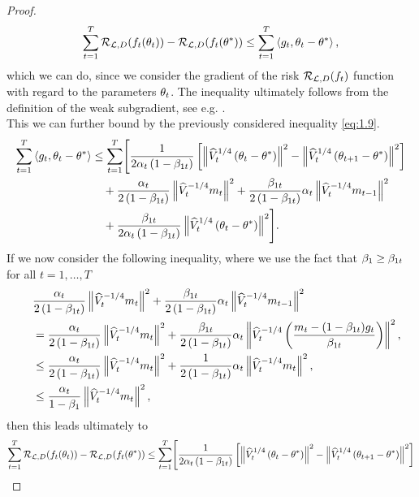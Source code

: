 \begin{proof}
\begin{align*}
\sum_{t=1}^T \operatorname{\mathcal{R}}_{\operatorname{\mathcal{L}}, D}(f_t(\theta_t)) - \operatorname{\mathcal{R}}_{\operatorname{\mathcal{L}}, D}(f_t(\theta^{\ast}))\leq \sum_{t=1}^T \left\langle g_t, \theta_t - \theta^{\ast} \right\rangle,
\end{align*}
which we can do, since we consider the gradient of the risk $\operatorname{\mathcal{R}}_{\operatorname{\mathcal{L}}, D}(f_t)$ function with regard to the parameters $\theta_t$. The inequality ultimately follows from the definition of the weak subgradient, see e.g. \cite[Remark~16.11.]{jahn2009vector}.\\
This we can further bound by the previously considered inequality \eqref{eq:1.9}.
\begin{align*}
\sum_{t=1}^T \left\langle g_t, \theta_t - \theta^{\ast} \right\rangle &\leq\sum_{t=1}^T \Biggl[ \frac{1}{2\alpha_t\left(1-\beta_{1t}\right)} \left[\left\| \widehat{V}_t^{1/4} \left( \theta_t - \theta^{\ast} \right) \right\|^2 - \left\| \widehat{V}_t^{1/4}\left(\theta_{t+1} - \theta^{\ast} \right) \right\|^2 \right] \\
&\quad +\frac{\alpha_t}{2\left(1-\beta_{1t}\right)} \left\| \widehat{V}_t^{-1/4} m_t \right\|^2 + \frac{\beta_{1t}}{2\left(1-\beta_{1t}\right)} \alpha_t \left\| \widehat{V}_t^{-1/4} m_{t-1}\right\|^2\\
&\quad + \frac{\beta_{1t}}{2\alpha_t \left( 1-\beta_{1t} \right)} \left\| \widehat{V}_t^{1/4}\left(\theta_t -\theta^{\ast} \right) \right\|^2 \Biggr].
\end{align*}
If we now consider the following inequality, where we use the fact that $\beta_1\geq \beta_{1t}$ for all $t=1,\ldots,T$
\begin{align*}
&\frac{\alpha_t}{2\left(1-\beta_{1t}\right)} \left\| \widehat{V}_t^{-1/4} m_t \right\|^2 + \frac{\beta_{1t}}{2\left(1-\beta_{1t}\right)} \alpha_t \left\| \widehat{V}_t^{-1/4} m_{t-1}\right\|^2\\
\quad &= \frac{\alpha_t}{2\left(1-\beta_{1t}\right)} \left\| \widehat{V}_t^{-1/4} m_t \right\|^2 + \frac{\beta_{1t}}{2\left(1-\beta_{1t}\right)} \alpha_t \left\| \widehat{V}_t^{-1/4} \left(\frac{m_{t} - (1-\beta_{1t})g_t}{\beta_{1t}}\right)\right\|^2,\\
\quad &\leq \frac{\alpha_t}{2\left(1-\beta_{1t}\right)} \left\| \widehat{V}_t^{-1/4} m_t \right\|^2 + \frac{1}{2\left(1-\beta_{1t}\right)} \alpha_t \left\| \widehat{V}_t^{-1/4} m_{t}\right\|^2,\\
\quad &\leq \frac{\alpha_t}{1-\beta_{1}} \left\| \widehat{V}_t^{-1/4} m_t \right\|^2,
\end{align*}
then this leads ultimately to
\begin{align}\label{eq:1.10}
\sum_{t=1}^T \risk_{\loss, D}(f_t(\t_t)) - \risk_{\loss, D}(f_t(\t^{\ast})) &\leq \sum_{t=1}^T \Biggl[ \frac{1}{2\a_t\left(1-\b_{1t}\right)} \left[\left\| \hat{V}_t^{1/4} \left( \t_t - \t^{\ast} \right) \right\|^2 - \left\| \hat{V}_t^{1/4}\left(\t_{t+1} - \t^{\ast} \right) \right\|^2 \right] \nonumber\\

\end{align}
\end{proof}

